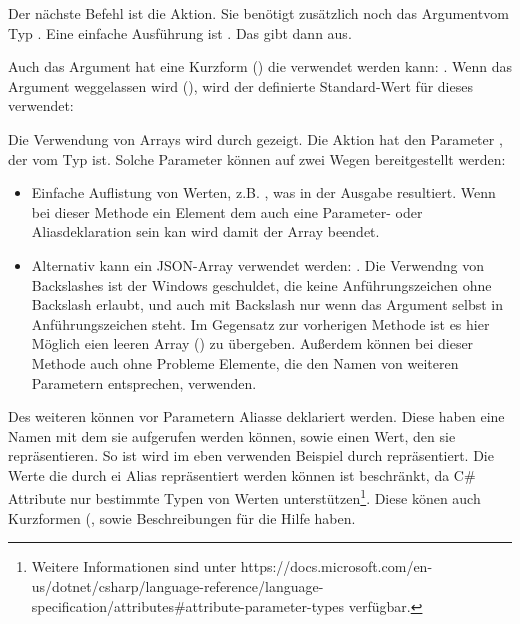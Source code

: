 Der nächste Befehl ist die  Aktion.
Sie benötigt zusätzlich noch das  Argumentvom Typ .
Eine einfache Ausführung ist .
Das gibt dann  aus.

Auch das Argument hat eine Kurzform () die verwendet werden kann: .
Wenn das Argument weggelassen wird (), wird der definierte Standard-Wert für dieses verwendet:

Die Verwendung von Arrays wird durch  gezeigt.
Die Aktion hat den Parameter , der vom Typ  ist.
Solche Parameter können auf zwei Wegen bereitgestellt werden:
\begin{itemize}
 \item Einfache Auflistung von Werten, z.B. , was in der Ausgabe  resultiert.
 Wenn bei dieser Methode ein Element dem auch eine Parameter- oder Aliasdeklaration sein kan wird damit der Array beendet.
 \item Alternativ kann ein JSON-Array verwendet werden: .
 Die Verwendng von Backslashes ist der Windows  geschuldet, die keine Anführungszeichen ohne Backslash erlaubt,
 und auch mit Backslash nur wenn das Argument selbst in Anführungszeichen steht.
 Im Gegensatz zur vorherigen Methode ist es hier Möglich eien leeren Array (\inlinecode{[]}) zu übergeben.
 Au\ss erdem können bei dieser Methode auch ohne Probleme Elemente, die den Namen von weiteren Parametern entsprechen, verwenden.
\end{itemize}

Des weiteren können vor Parametern Aliasse deklariert werden.
Diese haben eine Namen mit dem sie aufgerufen werden können, sowie einen Wert, den sie repräsentieren.
So ist wird im eben verwenden Beispiel  durch  repräsentiert.
Die Werte die durch ei Alias repräsentiert werden können ist beschränkt, da C\# Attribute nur bestimmte Typen von Werten unterstützen\footnote{Weitere Informationen sind unter https://docs.microsoft.com/en-us/dotnet/csharp/language-reference/language-specification/attributes\#attribute-parameter-types verfügbar.}.
Diese könen auch Kurzformen (, sowie Beschreibungen für die Hilfe haben.

